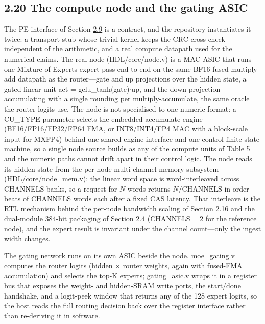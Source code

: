 \documentclass[12pt,onecolumn]{article}
\begin{document}
\subsection*{2.20 The compute node and the gating ASIC}\label{sec:2.20}

The PE interface of Section \hyperref[sec:2.9]{2.9} is a contract, and the repository instantiates it twice: a transport stub whose trivial kernel keeps the CRC cross-check independent of the arithmetic, and a real compute datapath used for the numerical claims. The real node (HDL/core/node.v) is a MAC ASIC that runs one Mixture-of-Experts expert pass end to end on the same BF16 fused-multiply-add datapath as the router---gate and up projections over the hidden state, a gated linear unit act = gelu\_tanh(gate)$\cdot$up, and the down projection---accumulating with a single rounding per multiply-accumulate, the same oracle the router logits use. The node is not specialised to one numeric format: a CU\_TYPE parameter selects the embedded accumulate engine (BF16/FP16/FP32/FP64 FMA, or INT8/INT4/FP4 MAC with a block-scale input for MXFP4) behind one shared engine interface and one control finite state machine, so a single node source builds as any of the compute units of Table 5 and the numeric paths cannot drift apart in their control logic. The node reads its hidden state from the per-node multi-channel memory subsystem (HDL/core/node\_mem.v): the linear word space is word-interleaved across CHANNELS banks, so a request for $N$ words returns $N/\mathrm{CHANNELS}$ in-order beats of CHANNELS words each after a fixed CAS latency. That interleave is the RTL mechanism behind the per-node bandwidth scaling of Section \hyperref[sec:2.16]{2.16} and the dual-module 384-bit packaging of Section \hyperref[sec:2.4]{2.4} (CHANNELS$=$2 for the reference node), and the expert result is invariant under the channel count---only the ingest width changes.

The gating network runs on its own ASIC beside the node. moe\_gating.v computes the router logits (hidden $\times$ router weights, again with fused-FMA accumulation) and selects the top-K experts; gating\_asic.v wraps it in a register bus that exposes the weight- and hidden-SRAM write ports, the start/done handshake, and a logit-peek window that returns any of the 128 expert logits, so the host reads the full routing decision back over the register interface rather than re-deriving it in software.
\end{document}
